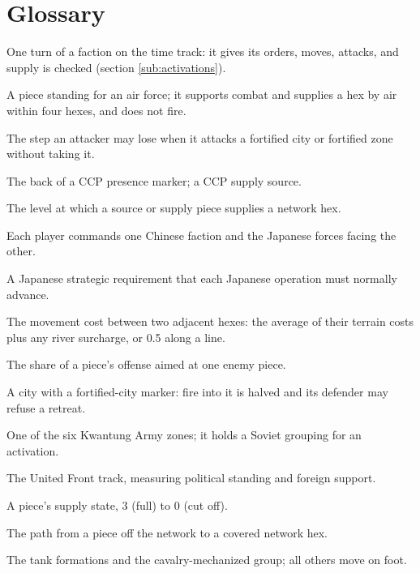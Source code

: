 \documentclass[11pt]{article}
\begin{document}
\section{Glossary}\label{sec:glossary}
\begin{description}[style=nextline,leftmargin=1.5em]
\item[Activation] One turn of a faction on the time track: it gives its orders, moves, attacks, and supply is checked (section \ref{sub:activations}).
\item[Air-support piece] A piece standing for an air force; it supports combat and supplies a hex by air within four hexes, and does not fire.
\item[Assault loss] The step an attacker may lose when it attacks a fortified city or fortified zone without taking it.
\item[Base area] The back of a CCP presence marker; a CCP supply source.
\item[Coverage] The level at which a source or supply piece supplies a network hex.
\item[Crossed control] Each player commands one Chinese faction and the Japanese forces facing the other.
\item[Directive] A Japanese strategic requirement that each Japanese operation must normally advance.
\item[Edge cost] The movement cost between two adjacent hexes: the average of their terrain costs plus any river surcharge, or 0.5 along a line.
\item[Fire stream] The share of a piece's offense aimed at one enemy piece.
\item[Fortified city] A city with a fortified-city marker: fire into it is halved and its defender may refuse a retreat.
\item[Fortified zone] One of the six Kwantung Army zones; it holds a Soviet grouping for an activation.
\item[Legitimacy] The United Front track, measuring political standing and foreign support.
\item[Level] A piece's supply state, 3 (full) to 0 (cut off).
\item[Local path] The path from a piece off the network to a covered network hex.
\item[Motorized] The tank formations and the cavalry-mechanized group; all others move on foot.

\end{description}
\end{document}

